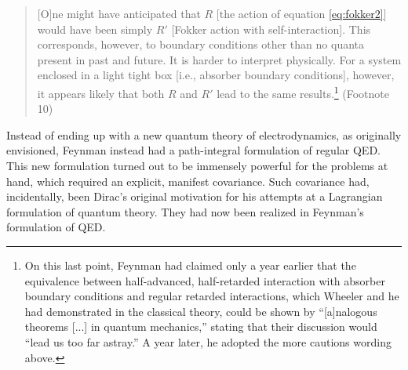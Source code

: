 \documentclass[12pt]{article}
\begin{document}
\begin{quote}
[O]ne might have anticipated that $R$ [the action of equation \ref{eq:fokker2}] would have been simply $R'$ [Fokker action with self-interaction]. This corresponds, however, to boundary conditions other than no quanta present in past and future. It is harder to interpret physically. For a system enclosed in a light tight box [i.e., absorber boundary conditions], however, it appears likely that both $R$ and $R'$ lead to the same results.\footnote{On this last point, Feynman had claimed only a year earlier \citep[fn 7]{feynman_1949_space-time} that the equivalence between half-advanced, half-retarded interaction with absorber boundary conditions and regular retarded interactions, which Wheeler and he had demonstrated in the classical theory, could be shown by ``[a]nalogous theorems [...] in quantum mechanics,'' stating that their discussion would ``lead us too far astray.'' A year later, he adopted the more cautions wording above.} (Footnote 10)
\end{quote}

Instead of ending up with a new quantum theory of electrodynamics, as originally envisioned, Feynman instead had a path-integral formulation of regular QED. This new formulation turned out to be immensely powerful for the problems at hand, which required an explicit, manifest covariance. Such covariance had, incidentally, been Dirac's original motivation for his attempts at a Lagrangian formulation of quantum theory. They had now been realized in Feynman's formulation of QED.
\end{document}
